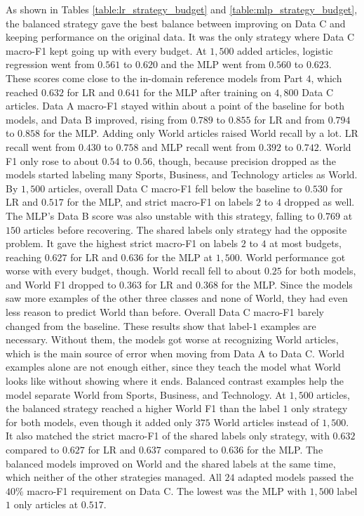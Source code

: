 \documentclass[letterpaper,conference,compsoc,onecolumn]{IEEEtran}
\begin{document}
As shown in Tables \ref{table:lr_strategy_budget} and \ref{table:mlp_strategy_budget}, the balanced strategy gave the best balance between improving on Data C and keeping performance on the original data. It was the only strategy where Data C macro-F1 kept going up with every budget. At $1,500$ added articles, logistic regression went from $0.561$ to $0.620$ and the MLP went from $0.560$ to $0.623$. These scores come close to the in-domain reference models from Part $4$, which reached $0.632$ for LR and $0.641$ for the MLP after training on $4,800$ Data C articles. Data A macro-F1 stayed within about a point of the baseline for both models, and Data B improved, rising from $0.789$ to $0.855$ for LR and from $0.794$ to $0.858$ for the MLP.
Adding only World articles raised World recall by a lot. LR recall went from $0.430$ to $0.758$ and MLP recall went from $0.392$ to $0.742$. World F1 only rose to about $0.54$ to $0.56$, though, because precision dropped as the models started labeling many Sports, Business, and Technology articles as World. By $1,500$ articles, overall Data C macro-F1 fell below the baseline to $0.530$ for LR and $0.517$ for the MLP, and strict macro-F1 on labels $2$ to $4$ dropped as well. The MLP's Data B score was also unstable with this strategy, falling to $0.769$ at $150$ articles before recovering.
The shared labels only strategy had the opposite problem. It gave the highest strict macro-F1 on labels $2$ to $4$ at most budgets, reaching $0.627$ for LR and $0.636$ for the MLP at $1,500$. World performance got worse with every budget, though. World recall fell to about $0.25$ for both models, and World F1 dropped to $0.363$ for LR and $0.368$ for the MLP. Since the models saw more examples of the other three classes and none of World, they had even less reason to predict World than before. Overall Data C macro-F1 barely changed from the baseline.
These results show that label-$1$ examples are necessary. Without them, the models got worse at recognizing World articles, which is the main source of error when moving from Data A to Data C. World examples alone are not enough either, since they teach the model what World looks like without showing where it ends. Balanced contrast examples help the model separate World from Sports, Business, and Technology. At $1,500$ articles, the balanced strategy reached a higher World F1 than the label $1$ only strategy for both models, even though it added only $375$ World articles instead of $1,500$. It also matched the strict macro-F1 of the shared labels only strategy, with $0.632$ compared to $0.627$ for LR and $0.637$ compared to $0.636$ for the MLP. The balanced models improved on World and the shared labels at the same time, which neither of the other strategies managed.
All $24$ adapted models passed the $40\%$ macro-F1 requirement on Data C. The lowest was the MLP with $1,500$ label $1$ only articles at $0.517$.
\end{document}
